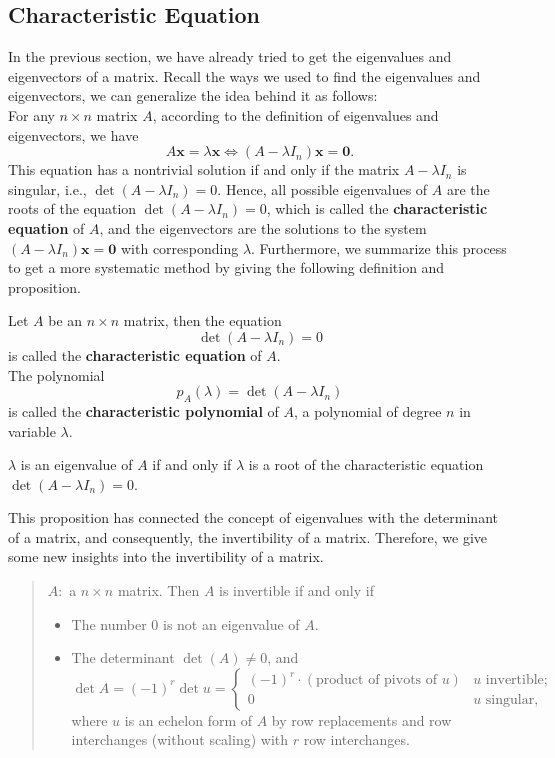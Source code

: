 \documentclass[10pt, a4paper]{article}
\newcommand{\vt}[1]{\mathbf{#1}}
\begin{document}
\subsection{Characteristic Equation}
\indent In the previous section, we have already tried to get the eigenvalues and eigenvectors of a matrix. 
Recall the ways we used to find the eigenvalues and eigenvectors, we can generalize the idea behind it as follows:\\
For any $n \times n$ matrix $A$, according to the definition of eigenvalues and eigenvectors, we have \[
A\vt{x}=\lambda\vt{x} \Leftrightarrow (A-\lambda I_n)\vt{x}=\vt{0}.
\]
This equation has a nontrivial solution if and only if the matrix $A-\lambda I_n$ is singular, i.e., $\det(A-\lambda I_n)=0$. 
Hence, all possible eigenvalues of $A$ are the roots of the equation $\det(A-\lambda I_n)=0$, which is called the \textbf{characteristic equation} of $A$, and the eigenvectors are the solutions to the system $(A-\lambda I_n)\vt{x}=\vt{0}$ with corresponding $\lambda$.
Furthermore, we summarize this process to get a more systematic method by giving the following definition and proposition.
\begin{definition}
    Let $A$ be an $n \times n$ matrix, then the equation \[
    \det(A-\lambda I_n)=0
    \]
    is called the \textbf{characteristic equation} of $A$.\\ 
    The polynomial \[
    p_A(\lambda)=\det(A-\lambda I_n)
    \]
    is called the \textbf{characteristic polynomial} of $A$, a polynomial of degree $n$ in variable $\lambda$.
\end{definition}
\begin{proposition}
    $\lambda$ is an eigenvalue of $A$ if and only if $\lambda$ is a root of the characteristic equation $\det(A-\lambda I_n)=0$.
\end{proposition}
\indent This proposition has connected the concept of eigenvalues with the determinant of a matrix, and consequently, the invertibility of a matrix.
Therefore, we give some new insights into the invertibility of a matrix.
\begin{quotation}
    $A:$ a $n \times n$ matrix. Then $A$ is invertible if and only if 
    \begin{itemize}
        \item The number 0 is not an eigenvalue of $A$.
        \item The determinant $\det(A)\neq 0$, and 
              \begin{equation*}
                \det A = (-1)^r \det u = \begin{cases}
                    (-1)^r\cdot(\text{product of pivots of $u$}) & \text{$u$ invertible};\\
                    0 & \text{$u$ singular},
                \end{cases}
              \end{equation*}
              where $u$ is an echelon form of $A$ by row replacements and row interchanges (without scaling) with $r$ row interchanges.
    \end{itemize}
\end{quotation}
\end{document}
